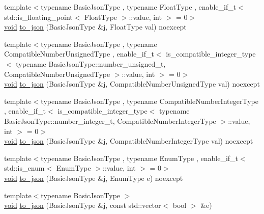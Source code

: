\begin{DoxyCompactItemize}
\item 
{\footnotesize template$<$typename Basic\+Json\+Type , typename Float\+Type , enable\+\_\+if\+\_\+t$<$ std\+::is\+\_\+floating\+\_\+point$<$ Float\+Type $>$\+::value, int $>$  = 0$>$ }\\\hyperlink{namespacenlohmann_1_1detail_a59fca69799f6b9e366710cb9043aa77d}{void} \hyperlink{namespacenlohmann_1_1detail_a22bffdc8bc7e43af380ba2050696b230}{to\+\_\+json} (Basic\+Json\+Type \&j, Float\+Type val) noexcept
\item 
{\footnotesize template$<$typename Basic\+Json\+Type , typename Compatible\+Number\+Unsigned\+Type , enable\+\_\+if\+\_\+t$<$ is\+\_\+compatible\+\_\+integer\+\_\+type$<$ typename Basic\+Json\+Type\+::number\+\_\+unsigned\+\_\+t, Compatible\+Number\+Unsigned\+Type $>$\+::value, int $>$  = 0$>$ }\\\hyperlink{namespacenlohmann_1_1detail_a59fca69799f6b9e366710cb9043aa77d}{void} \hyperlink{namespacenlohmann_1_1detail_ae5fd66b5517b3b5a6c6b9fd9f29ba8dc}{to\+\_\+json} (Basic\+Json\+Type \&j, Compatible\+Number\+Unsigned\+Type val) noexcept
\item 
{\footnotesize template$<$typename Basic\+Json\+Type , typename Compatible\+Number\+Integer\+Type , enable\+\_\+if\+\_\+t$<$ is\+\_\+compatible\+\_\+integer\+\_\+type$<$ typename Basic\+Json\+Type\+::number\+\_\+integer\+\_\+t, Compatible\+Number\+Integer\+Type $>$\+::value, int $>$  = 0$>$ }\\\hyperlink{namespacenlohmann_1_1detail_a59fca69799f6b9e366710cb9043aa77d}{void} \hyperlink{namespacenlohmann_1_1detail_a91fe576be579c8c2fdd14610605c6dd2}{to\+\_\+json} (Basic\+Json\+Type \&j, Compatible\+Number\+Integer\+Type val) noexcept
\item 
{\footnotesize template$<$typename Basic\+Json\+Type , typename Enum\+Type , enable\+\_\+if\+\_\+t$<$ std\+::is\+\_\+enum$<$ Enum\+Type $>$\+::value, int $>$  = 0$>$ }\\\hyperlink{namespacenlohmann_1_1detail_a59fca69799f6b9e366710cb9043aa77d}{void} \hyperlink{namespacenlohmann_1_1detail_a0c8b159dba71981d6c555d284cf6e2bf}{to\+\_\+json} (Basic\+Json\+Type \&j, Enum\+Type e) noexcept
\item 
{\footnotesize template$<$typename Basic\+Json\+Type $>$ }\\\hyperlink{namespacenlohmann_1_1detail_a59fca69799f6b9e366710cb9043aa77d}{void} \hyperlink{namespacenlohmann_1_1detail_aeca6fb5fede5ed1e12a4420d98a5692b}{to\+\_\+json} (Basic\+Json\+Type \&j, const std\+::vector$<$ bool $>$ \&e)
\item 

\end{DoxyCompactItemize}
